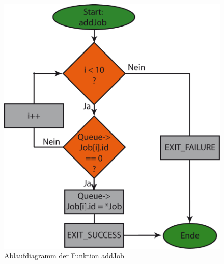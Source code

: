 \begin{figure}[h]
\includegraphics[scale = 0.8]{./addJob.png}
\hspace{-14pt}
\caption{Ablaufdiagramm der Funktion addJob}
\end{figure} 

